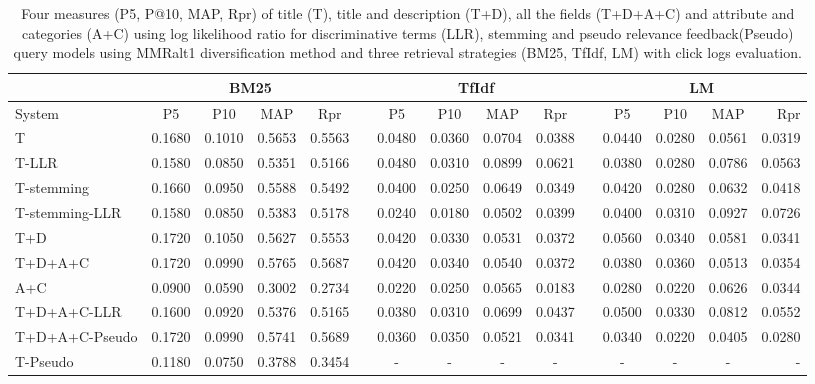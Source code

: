 \begin{table}[H]
\begin{center}
\scriptsize
\caption{
Four measures (P\@5, P@10, MAP, Rpr) of title (T), title and description (T+D), all the fields (T+D+A+C) and attribute and categories (A+C) using log likelihood ratio for discriminative terms (LLR), stemming and pseudo relevance feedback(Pseudo) query models using MMRalt1 diversification method and three retrieval strategies (BM25, TfIdf, LM) with click logs evaluation.}
\label{table:mmrAlt1Cl}

\begin{tabular}{lcccccccccccccr}
\toprule
 & \multicolumn{4}{c}{BM25} &    & \multicolumn{4}{c}{TfIdf} &    & \multicolumn{4}{c}{LM} \\
\midrule
System & P\@5 & P\@10 & MAP & Rpr &   & P\@5 & P\@10 & MAP & Rpr &   & P\@5 & P\@10 & MAP & Rpr \\
\midrule
T & 0.1680 & 0.1010 & 0.5653 & 0.5563 &   & 0.0480 & 0.0360 & 0.0704 & 0.0388 &   & 0.0440 & 0.0280 & 0.0561 & 0.0319 \\
T-LLR & 0.1580 & 0.0850 & 0.5351 & 0.5166 &   & 0.0480 & 0.0310 & 0.0899 & 0.0621 &   & 0.0380 & 0.0280 & 0.0786 & 0.0563 \\
T-stemming & 0.1660 & 0.0950 & 0.5588 & 0.5492 &   & 0.0400 & 0.0250 & 0.0649 & 0.0349 &   & 0.0420 & 0.0280 & 0.0632 & 0.0418 \\
T-stemming-LLR & 0.1580 & 0.0850 & 0.5383 & 0.5178 &   & 0.0240 & 0.0180 & 0.0502 & 0.0399 &   & 0.0400 & 0.0310 & 0.0927 & 0.0726 \\
T+D & 0.1720 & 0.1050 & 0.5627 & 0.5553 &   & 0.0420 & 0.0330 & 0.0531 & 0.0372 &   & 0.0560 & 0.0340 & 0.0581 & 0.0341 \\
T+D+A+C & 0.1720 & 0.0990 & 0.5765 & 0.5687 &   & 0.0420 & 0.0340 & 0.0540 & 0.0372 &   & 0.0380 & 0.0360 & 0.0513 & 0.0354 \\
A+C & 0.0900 & 0.0590 & 0.3002 & 0.2734 &   & 0.0220 & 0.0250 & 0.0565 & 0.0183 &   & 0.0280 & 0.0220 & 0.0626 & 0.0344 \\
T+D+A+C-LLR & 0.1600 & 0.0920 & 0.5376 & 0.5165 &   & 0.0380 & 0.0310 & 0.0699 & 0.0437 &   & 0.0500 & 0.0330 & 0.0812 & 0.0552 \\
T+D+A+C-Pseudo & 0.1720 & 0.0990 & 0.5741 & 0.5689 &   & 0.0360 & 0.0350 & 0.0521 & 0.0341 &   & 0.0340 & 0.0220 & 0.0405 & 0.0280 \\
T-Pseudo & 0.1180 & 0.0750 & 0.3788 & 0.3454 &   & - & - & - & - &   & - & - & - & -  \\
\bottomrule
\end{tabular}
\end{center}
\end{table}

